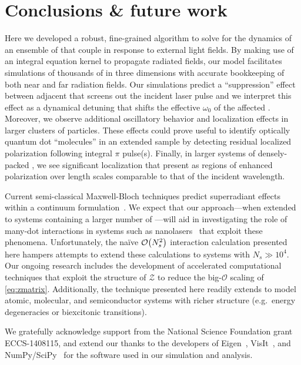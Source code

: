\section{\label{section:conclusion}Conclusions \& future work}
Here we developed a robust, fine-grained algorithm to solve for the dynamics of an ensemble of \qds{} that couple in response to external light fields.
By making use of an integral equation kernel to propagate radiated fields, our model facilitates simulations of thousands of \qds{} in three dimensions with accurate bookkeeping of both near and far radiation fields.
Our simulations predict a ``suppression'' effect between adjacent \qds{} that screens out the incident laser pulse and we interpret this effect as a dynamical detuning that shifts the effective $\omega_0$ of the affected \qds{}.
Moreover, we observe additional oscillatory behavior and localization effects in larger clusters of particles.
These effects could prove useful to identify optically quantum dot ``molecules'' in an extended sample by detecting residual localized polarization following integral $\pi$ pulse(s).
Finally, in larger systems of densely-packed \qds{}, we see significant localization that present as regions of enhanced polarization over length scales comparable to that of the incident wavelength.

Current semi-classical Maxwell-Bloch techniques predict superradiant effects within a continuum formulation~\cite{Gross1982,PhysRevA.4.302,PhysRevA.4.854}.
We expect that our approach---when extended to systems containing a larger number of \qds{}---will aid in investigating the role of many-dot interactions in systems such as nanolasers~\cite{jahnke2016giant} that exploit these phenomena.
Unfortunately, the na\"ive $\mathcal{O}\qty(N_s^2)$ interaction calculation presented here hampers attempts to extend these calculations to systems with $N_s \gg 10^4$.
Our ongoing research includes the development of accelerated computational techniques that exploit the structure of $\mathcal{Z}$ to reduce the big-$\mathcal{O}$ scaling of \cref{eq:zmatrix}.
Additionally, the technique presented here readily extends to model atomic, molecular, and semiconductor systems with richer structure (e.g.\ energy degeneracies or biexcitonic transitions).

\acknowledgments
We gratefully acknowledge support from the National Science Foundation grant ECCS-1408115, and extend our thanks to the developers of Eigen~\cite{Eigen}, VisIt~\cite{VisIt}, and NumPy/SciPy~\cite{NumPy,SciPy} for the software used in our simulation and analysis.
